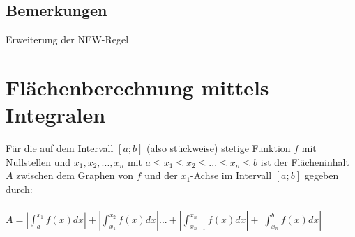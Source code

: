 \subsection{Bemerkungen}
Erweiterung der NEW-Regel

\section{Flächenberechnung mittels Integralen}
\begin{Definition}
  Für die auf dem Intervall $[a;b]$ (also stückweise) stetige Funktion $f$ mit Nullstellen und $x_1,x_2,...,x_n$
  mit $a \leq x_1 \leq x_2 \leq ... \leq x_n \leq b$ ist der Flächeninhalt $A$ zwischen dem Graphen von $f$ und
  der $x_1$-Achse im Intervall $[a;b]$ gegeben durch:\\\\
  $A= |{\int_a^{x_1} f(x)dx}|+|{\int_{x_1}^{x_2} f(x)dx}|...+|{\int_{x_{n-1}}^{x_n} f(x)dx}|+|{\int_{x_n}^b f(x)dx}|$
\end{Definition}

